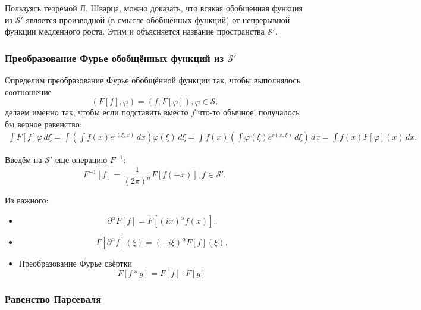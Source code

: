 Пользуясь теоремой Л. Шварца, можно доказать, что всякая обобщенная функция из $\mathcal{S}'$
является производной (в смысле обобщённых функций) от непрерывной функции медленного роста. Этим и
объясняется название пространства $\mathcal{S}'$.

\subsubsection{Преобразование Фурье обобщённых функций из $\mathcal{S}'$}

Определим преобразование Фурье обобщённой функции так, чтобы выполнялось соотношение
\[
  (F[f], \varphi) = (f, F[\varphi]), \varphi \in \mathcal{S}.
\]
делаем именно так, чтобы если подставить вместо $f$ что-то обычное, получалось бы верное равенство:
\begin{multline*}
  \int F[f] \varphi \, d\xi
  = \int \left( \int f(x) e^{i (\xi, x)} \, dx \right) \varphi(\xi) \, d\xi
  = \int f(x) \left( \int \varphi(\xi) e^{i (x, \xi)} \, d\xi \right) \, dx
  = \int f(x) F[\varphi](x) \, dx.
\end{multline*}

Введём на $\mathcal{S}'$ еще операцию $F^{-1}$:
\[
  F^{-1}[f] = \dfrac{1}{(2\pi)^n} F[f(-x)], f\in\mathcal{S}'.
\]

Из важного:
\begin{itemize}
  \item 
    \[
      \partial^\alpha F[f] = F \left[ (ix)^\alpha f(x) \right].
    \]
  \item
    \[
      F \left[ \partial^\alpha f \right] (\xi) = (-i\xi)^\alpha F[f] (\xi).
    \]
  \item Преобразование Фурье свёртки
    \[
      F \left[ f * g \right] = F[f] \cdot F[g]
    \]
\end{itemize}

\subsubsection{Равенство Парсеваля}


